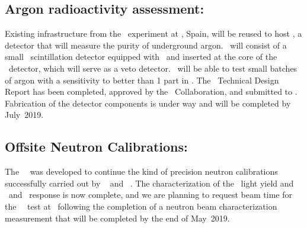 \subsection{Argon radioactivity assessment: \DArT}
\label{sec:DArT}

Existing infrastructure from the \ArDM\ experiment at \LSC, Spain, will be reused to host \DArT, a detector that will measure the purity of underground argon.  \DArT\ will consist of a small \DArTVolume\ scintillation detector equipped with \SiPMs\ and inserted at the core of the \ArDM\ detector, which will serve as a veto detector.  \DArT\ will be able to test small batches of argon with a sensitivity to  better than 1 part in \DArTUArSensitivityUltimate.  The \DArT\ Technical Design Report has been completed, approved by the \GADMC\ Collaboration, and submitted to \LSC.  Fabrication of the detector components is under way and will be completed by July~2019.

\subsection{Offsite Neutron Calibrations: \ReD}
\label{sec:ReD}

The \ReD\ \LArTPC\ was developed to continue the kind of precision neutron calibrations successfully carried out by \SCENE~\cite{Alexander:2013ke,Cao:2014tw,Cao:2015ks} and \ARIS~\cite{Agnes:2018cn}. The characterization of the \ReD\ light yield and \SOne\ and \STwo\ response is now complete, and we are planning to request beam time for the \ReD\ \LArTPC\ test at \LNS\ following the completion of a neutron beam characterization measurement that will be completed by the end of May~2019.